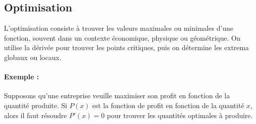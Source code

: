 \documentclass{article}
\begin{document}
	\subsection{Optimisation}
	
	L'optimisation consiste à trouver les valeurs maximales ou minimales d'une fonction, souvent dans un contexte économique, physique ou géométrique. On utilise la dérivée pour trouver les points critiques, puis on détermine les extrema globaux ou locaux.
	
	\paragraph{Exemple :} Supposons qu'une entreprise veuille maximiser son profit en fonction de la quantité produite. Si \( P(x) \) est la fonction de profit en fonction de la quantité \( x \), alors il faut résoudre \( P'(x) = 0 \) pour trouver les quantités optimales à produire.
	
	
	
	
	
	
	
\end{document}

